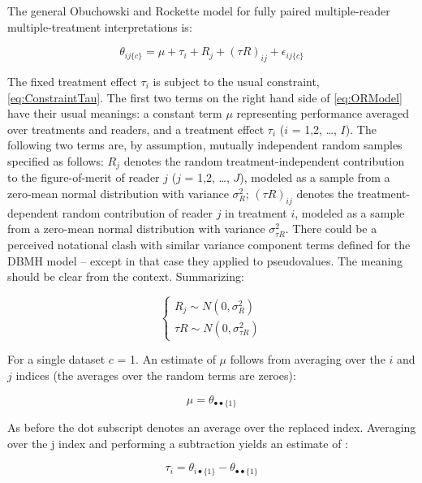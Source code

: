 \documentclass[
]{book}
\begin{document}
The general Obuchowski and Rockette model for fully paired multiple-reader multiple-treatment interpretations is:

\begin{equation}
\theta_{ij\{c\}}=\mu+\tau_i+R_j+(\tau R)_{ij}+\epsilon_{ij\{c\}}
\label{eq:ORModel}
\end{equation}

The fixed treatment effect \(\tau_i\) is subject to the usual constraint, \eqref{eq:ConstraintTau}. The first two terms on the right hand side of \eqref{eq:ORModel} have their usual meanings: a constant term \(\mu\) representing performance averaged over treatments and readers, and a treatment effect \(\tau_i\) (\(i\) = 1,2, \ldots, \(I\)). The following two terms are, by assumption, mutually independent random samples specified as follows: \(R_j\) denotes the random treatment-independent contribution to the figure-of-merit of reader \(j\) (\(j\) = 1,2, \ldots, \(J\)), modeled as a sample from a zero-mean normal distribution with variance \(\sigma_R^2\); \((\tau R)_{ij}\) denotes the treatment-dependent random contribution of reader \(j\) in treatment \(i\), modeled as a sample from a zero-mean normal distribution with variance \(\sigma_{\tau R}^2\). There could be a perceived notational clash with similar variance component terms defined for the DBMH model -- except in that case they applied to pseudovalues. The meaning should be clear from the context. Summarizing:

\begin{equation}
\left\{\begin{matrix}
R_j \sim N(0,\sigma_R^2)\\ 
{\tau R} \sim N(0,\sigma_{\tau R}^2)
\end{matrix}\right.
\label{eq:ORVariances}
\end{equation}

For a single dataset \(c\) = 1. An estimate of \(\mu\) follows from averaging over the \(i\) and \(j\) indices (the averages over the random terms are zeroes):

\begin{equation}
\mu = \theta_{\bullet \bullet \{1\}}
\label{eq:ORmuEstimate}
\end{equation}

As before the dot subscript denotes an average over the replaced index. Averaging over the j index and performing a subtraction yields an estimate of :

\begin{equation}
\tau_i = \theta_{i \bullet \{1\}} - \theta_{\bullet \bullet \{1\}}
\label{eq:ORtauEstimate}
\end{equation}
\end{document}
